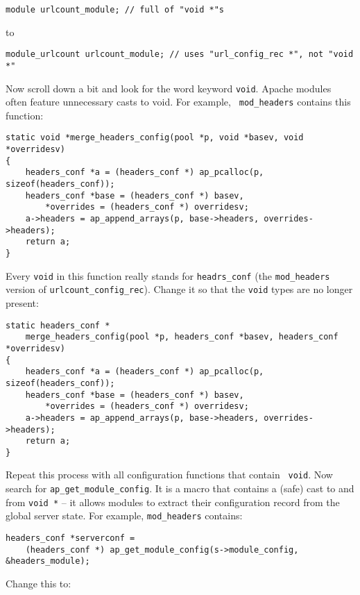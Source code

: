 \documentclass{book}
\begin{document}
\begin{verbatim}
module urlcount_module; // full of "void *"s
\end{verbatim}

to

\begin{verbatim}
module_urlcount urlcount_module; // uses "url_config_rec *", not "void *"
\end{verbatim}

Now scroll down a bit and look for the word keyword {\tt void}. Apache
modules often feature unnecessary casts to void. For example, {\tt
mod\_headers} contains this function:

\begin{verbatim}
static void *merge_headers_config(pool *p, void *basev, void *overridesv)
{
    headers_conf *a = (headers_conf *) ap_pcalloc(p, sizeof(headers_conf));
    headers_conf *base = (headers_conf *) basev, 
        *overrides = (headers_conf *) overridesv;
    a->headers = ap_append_arrays(p, base->headers, overrides->headers);
    return a;
}
\end{verbatim}

Every {\tt void} in this function really stands for {\tt headrs\_conf} (the
{\tt mod\_headers} version of {\tt urlcount\_config\_rec}). Change it so
that the {\tt void} types are no longer present: 

\begin{verbatim}
static headers_conf *
    merge_headers_config(pool *p, headers_conf *basev, headers_conf *overridesv)
{
    headers_conf *a = (headers_conf *) ap_pcalloc(p, sizeof(headers_conf));
    headers_conf *base = (headers_conf *) basev, 
        *overrides = (headers_conf *) overridesv;
    a->headers = ap_append_arrays(p, base->headers, overrides->headers);
    return a;
}
\end{verbatim}

Repeat this process with all configuration functions that contain {\tt
void}. Now search for {\tt ap\_get\_module\_config}. It is a macro that
contains a (safe) cast to and from {\tt void *} -- it allows modules to
extract their configuration record from the global server state. For
example, {\tt mod\_headers} contains:

\begin{verbatim}
headers_conf *serverconf =
    (headers_conf *) ap_get_module_config(s->module_config, &headers_module);
\end{verbatim}

Change this to:
\end{document}
